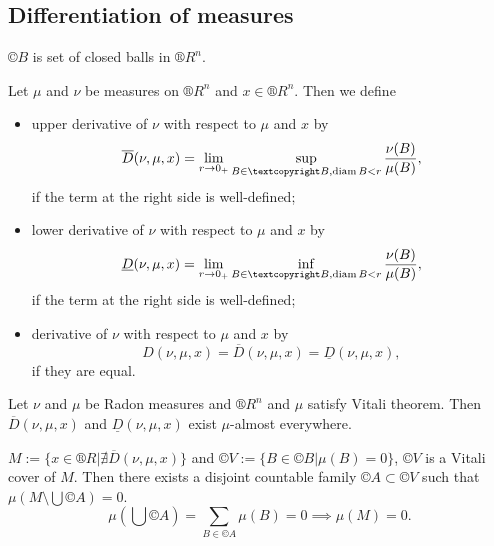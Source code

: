 \documentclass[12pt]{article}					%
\begin{document}
\subsection{Differentiation of measures}
\begin{poznamka}[Notation]
	$©B$ is set of closed balls in $®R^n$.
\end{poznamka}

\begin{definice}
	Let $\mu$ and $\nu$ be measures on $®R^n$ and $x \in ®R^n$. Then we define
	\begin{itemize}
		\item upper derivative of $\nu$ with respect to $\mu$ and $x$ by
			$$ \overline{D}(\nu, \mu, x) = \lim_{r \rightarrow 0_+} \sup_{B \in ©B, \diam B < r} \frac{\nu(B)}{\mu(B)}, $$
			if the term at the right side is well-defined;
		\item lower derivative of $\nu$ with respect to $\mu$ and $x$ by
			$$ \underline{D}(\nu, \mu, x) = \lim_{r \rightarrow 0_+} \inf_{B \in ©B, \diam B < r} \frac{\nu(B)}{\mu(B)}, $$
			if the term at the right side is well-defined;
		\item derivative of $\nu$ with respect to $\mu$ and $x$ by
			$$ D(\nu, \mu, x) = \overline{D}(\nu, \mu, x) = \underline{D}(\nu, \mu, x), $$
			if they are equal.
	\end{itemize}
\end{definice}

\begin{veta}
	Let $\nu$ and $\mu$ be Radon measures and $®R^n$ and $\mu$ satisfy Vitali theorem. Then $\overline{D}(\nu, \mu, x)$ and $\underline{D}(\nu, \mu, x)$ exist $\mu$-almost everywhere.

	\begin{dukazin}
		$M := \{x \in ®R | \nexists\overline{D}(\nu, \mu, x)\}$ and $©V := \{B \in ©B | \mu(B) = 0\}$, $©V$ is a Vitali cover of $M$. Then there exists a disjoint countable family $©A \subset ©V$ such that $\mu(M \setminus \bigcup ©A) = 0$.
		$$ \mu(\bigcup ©A) = \sum_{B \in ©A} \mu(B) = 0 \implies \mu(M) = 0. $$
	\end{dukazin}
\end{veta}
\end{document}
